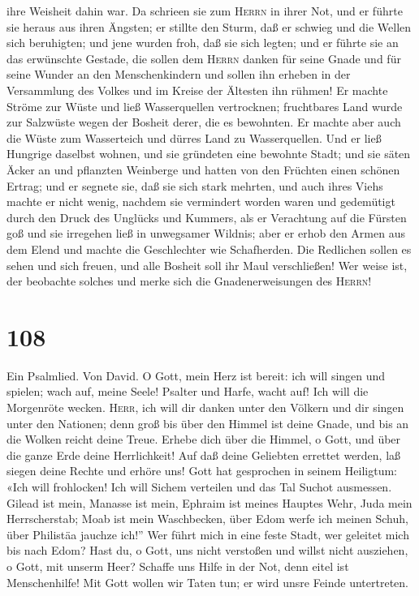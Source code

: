 ihre Weisheit dahin war.  Da schrieen sie zum
\textsc{Herrn} in ihrer Not, und er führte sie heraus aus ihren Ängsten;
 er stillte den Sturm, daß er schwieg und die Wellen sich
beruhigten;  und jene wurden froh, daß sie sich legten;
und er führte sie an das erwünschte Gestade,  die sollen
dem \textsc{Herrn} danken für seine Gnade und für seine Wunder an den
Menschenkindern  und sollen ihn erheben in der
Versammlung des Volkes und im Kreise der Ältesten ihn rühmen!
 Er machte Ströme zur Wüste und ließ Wasserquellen
vertrocknen;  fruchtbares Land wurde zur Salzwüste wegen
der Bosheit derer, die es bewohnten.  Er machte aber auch
die Wüste zum Wasserteich und dürres Land zu Wasserquellen.
 Und er ließ Hungrige daselbst wohnen, und sie gründeten
eine bewohnte Stadt;  und sie säten Äcker an und
pflanzten Weinberge und hatten von den Früchten einen schönen Ertrag;
 und er segnete sie, daß sie sich stark mehrten, und auch
ihres Viehs machte er nicht wenig,  nachdem sie
vermindert worden waren und gedemütigt durch den Druck des Unglücks und
Kummers,  als er Verachtung auf die Fürsten goß und sie
irregehen ließ in unwegsamer Wildnis;  aber er erhob den
Armen aus dem Elend und machte die Geschlechter wie Schafherden.
 Die Redlichen sollen es sehen und sich freuen, und alle
Bosheit soll ihr Maul verschließen!  Wer weise ist, der
beobachte solches und merke sich die Gnadenerweisungen des
\textsc{Herrn}!

\hypertarget{section-107}{%
\section{108}\label{section-107}}

 Ein Psalmlied. Von David. O Gott, mein Herz ist bereit:
ich will singen und spielen; wach auf, meine Seele! 
Psalter und Harfe, wacht auf! Ich will die Morgenröte wecken.
 \textsc{Herr}, ich will dir danken unter den Völkern und
dir singen unter den Nationen;  denn groß bis über den
Himmel ist deine Gnade, und bis an die Wolken reicht deine Treue.
 Erhebe dich über die Himmel, o Gott, und über die ganze
Erde deine Herrlichkeit!  Auf daß deine Geliebten errettet
werden, laß siegen deine Rechte und erhöre uns!  Gott hat
gesprochen in seinem Heiligtum: «Ich will frohlocken! Ich will Sichem
verteilen und das Tal Suchot ausmessen.  Gilead ist mein,
Manasse ist mein, Ephraim ist meines Hauptes Wehr, Juda mein
Herrscherstab;  Moab ist mein Waschbecken, über Edom werfe
ich meinen Schuh, über Philistäa jauchze ich!''  Wer
führt mich in eine feste Stadt, wer geleitet mich bis nach Edom?
 Hast du, o Gott, uns nicht verstoßen und willst nicht
ausziehen, o Gott, mit unserm Heer?  Schaffe uns Hilfe in
der Not, denn eitel ist Menschenhilfe!  Mit Gott wollen
wir Taten tun; er wird unsre Feinde untertreten.

